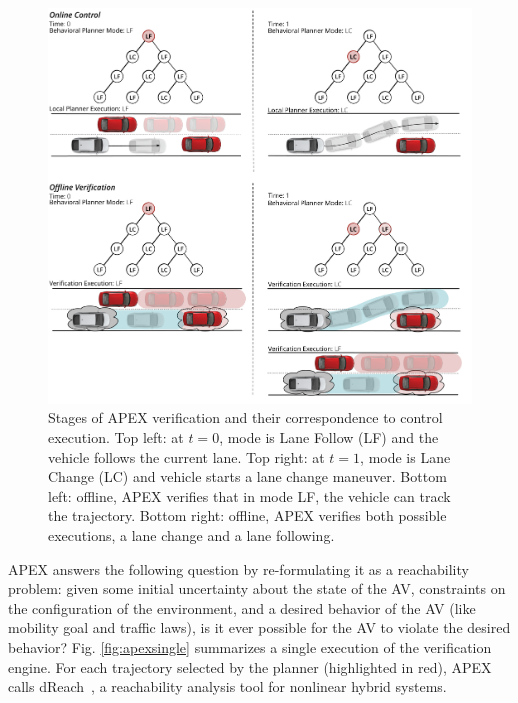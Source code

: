  \begin{figure}[!t]
 	\centering
 	\includegraphics[width=\textwidth]{figures/apex_approach.pdf}
 	\caption{ \small Stages of APEX verification and their correspondence to control execution. Top left: at $t=0$, mode is Lane Follow (LF) and the vehicle follows the current lane. Top right: at $t=1$, mode is Lane Change (LC) and vehicle starts a lane change maneuver. Bottom left: offline, APEX verifies that in mode LF, the vehicle can track the trajectory. Bottom right: offline, APEX verifies both possible executions, a lane change and a lane following.}
	\vspace{-10pt}
 	\label{fig:apex_internals}
 \end{figure}
APEX answers the following question by re-formulating it as a reachability problem: given some initial uncertainty about the state of the AV, constraints on the configuration of the environment, and a desired behavior of the AV (like mobility goal and traffic laws), is it ever possible for the AV to violate the desired behavior?
Fig. \ref{fig:apexsingle} summarizes a single execution of the verification engine.
For each trajectory selected by the planner (highlighted in red), APEX calls dReach~\cite{gao2014delta}, a reachability analysis tool for nonlinear hybrid systems.
% 


